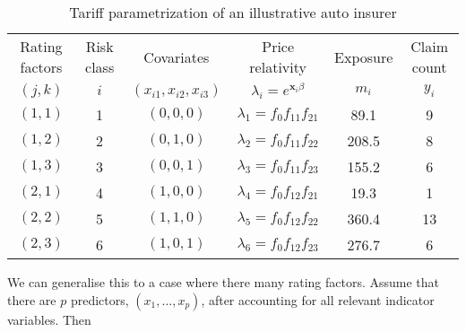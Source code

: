\documentclass[12pt]{article}
\begin{document}
\begin{table}[htp]
\caption{Tariff parametrization of an illustrative auto insurer}
\begin{center}
\begin{tabular}{cccccc}
 \hline
{Rating factors } &  Risk class & Covariates & Price relativity & Exposure & Claim count \\
$(j,k)$ & $i$ & $(x_{i1}, x_{i2},x_{i3})$ & $\lambda_i=e^{\mathbf{ x}_i\beta}$&  $m_i$ & $y_i$\\
\hline \hline
$(1,1)$ &  1 & $(0,0,0)$ & $\lambda_1=f_0f_{11}f_{21}$ & 89.1 & 9\\
$(1,2)$ &2  & $(0,1,0)$ & $\lambda_2=f_0f_{11}f_{22}$ & 208.5& 8\\
$(1, 3)$ & 3 &$(0,0,1)$ & $\lambda_3=f_0f_{11}f_{23}$ & 155.2 & 6  \\
$(2 , 1)$ & 4 & $(1,0,0)$ & $\lambda_4=f_0f_{12}f_{21}$ & 19.3 & 1 \\
$(2 , 2)$ & 5 & $(1,1,0)$ & $\lambda_5=f_0f_{12}f_{22}$& 360.4 & 13 \\
$(2 , 3)$ & 6 & $(1,0,1)$ & $\lambda_6=f_0f_{12}f_{23}$ & 276.7 & 6 \\ \hline
\end{tabular}
\end{center}
\label{tab.tariff.2}
\end{table}%
% 
We can generalise this to a case where there many rating factors. Assume that there are $p$ predictors, $(x_1, \ldots ,x_p)$, after accounting for all relevant indicator variables. Then 
\end{document}
